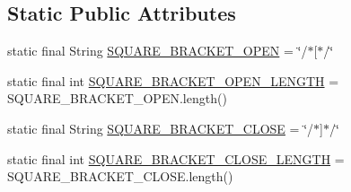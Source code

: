 \subsection*{Static Public Attributes}
\begin{DoxyCompactItemize}
\item 
static final String \hyperlink{classorg_1_1eclipse_1_1jdt_1_1ui_1_1tests_1_1refactoring_1_1infra_1_1AbstractSelectionTestCase_a8eb0547bed07d3a385682187b000924a}{SQUARE\_\-BRACKET\_\-OPEN} = \char`\"{}/$\ast$\mbox{[}$\ast$/\char`\"{}
\item 
static final int \hyperlink{classorg_1_1eclipse_1_1jdt_1_1ui_1_1tests_1_1refactoring_1_1infra_1_1AbstractSelectionTestCase_a1828ebda4e99645d7bee1fd31474b139}{SQUARE\_\-BRACKET\_\-OPEN\_\-LENGTH} = SQUARE\_\-BRACKET\_\-OPEN.length()
\item 
static final String \hyperlink{classorg_1_1eclipse_1_1jdt_1_1ui_1_1tests_1_1refactoring_1_1infra_1_1AbstractSelectionTestCase_aaa811e067deac78f619afe57541dfb8f}{SQUARE\_\-BRACKET\_\-CLOSE} = \char`\"{}/$\ast$\mbox{]}$\ast$/\char`\"{}
\item 
static final int \hyperlink{classorg_1_1eclipse_1_1jdt_1_1ui_1_1tests_1_1refactoring_1_1infra_1_1AbstractSelectionTestCase_a37490586308d38bb5c17f88d7238f8cb}{SQUARE\_\-BRACKET\_\-CLOSE\_\-LENGTH} = SQUARE\_\-BRACKET\_\-CLOSE.length()
\end{DoxyCompactItemize}
